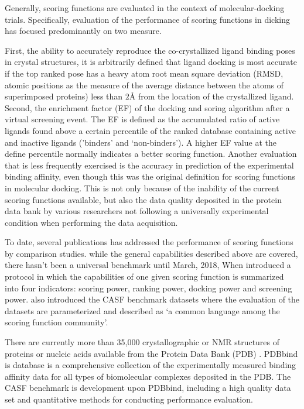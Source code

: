 Generally, scoring functions are evaluated in the context of molecular-docking trials.
Specifically, evaluation of the performance of scoring functions in dicking has focused predominantly on two measure. 

First, the ability to accurately reproduce the co-crystallized ligand binding poses in crystal structures, it is arbitrarily defined that ligand docking is most accurate if the top ranked pose has a heavy atom root mean square deviation (RMSD, atomic positions as the measure of the average distance between the atoms of superimposed proteins) less than $2\si{\angstrom}$ from the location of the crystallized ligand.
Second, the enrichment factor (EF) of the docking and soring algorithm after a virtual screening event. The EF is defined as the accumulated ratio of active ligands found above a certain percentile of the ranked database containing active and inactive ligands ('binders' and `non-binders'). A higher EF value at the define percentile normally indicates a better scoring function.
Another evaluation that is less frequently exercised is the accuracy in prediction of the experimental binding affinity, even though this was the original definition for scoring functions in molecular docking.
This is not only because of the inability of the current scoring functions available, but also the data quality deposited in the protein data bank by various researchers not following a universally experimental condition when performing the data acquisition.

To date, several publications has addressed the performance of scoring functions by comparison studies. 
while the general capabilities described above are covered, 
there hasn't been a universal benchmark until March, 2018, When \citet{li2018assessing} introduced a
protocol in which the capabilities of one given scoring function is summarized into four indicators: scoring power, ranking power, docking power and screening power.
\citet{li2018assessing} also introduced the CASF benchmark datasets where the evaluation of the datasets are parameterized and described as `a common language among the scoring function community'.

There are currently more than 35,000 crystallographic or NMR structures of proteins or nucleic acids available from the Protein Data Bank (PDB) \cite{Bernstein1977}. 
PDBbind is database is a comprehensive collection of the experimentally measured binding affinity data 
for all types of biomolecular complexes deposited in the PDB\cite{wang2004pdbbind}.
The CASF benchmark \cite{li2014comparative} is development upon PDBbind, 
including a high quality data set and quantitative methods for conducting performance evaluation.

